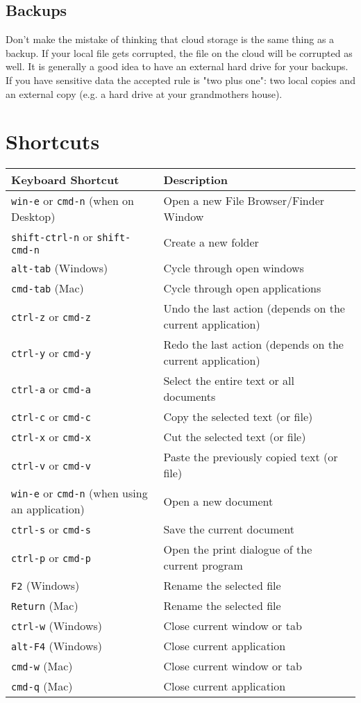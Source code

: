\documentclass[11pt,a4paper]{report}
\begin{document}
\subsection{Backups} 

Don't make the mistake of thinking that cloud storage is the same thing as a backup. If your local file gets corrupted, the file on the cloud will be corrupted as well. It is generally a good idea to have an external hard drive for your backups. If you have sensitive data the accepted rule is "two plus one": two local copies and an external copy (e.g. a hard drive at your grandmothers house).


\section{Shortcuts}
\begin{longtable}{|p{}|p{}|}
\hline
{\bf Keyboard Shortcut} & {\bf Description}  \\
\hline 
\endhead
\verb|win-e| or \verb|cmd-n| (when on Desktop) & Open a new File Browser/Finder Window \\
\hline
\verb|shift-ctrl-n| or \verb|shift-cmd-n| & Create a new folder\\
\hline
\verb|alt-tab| (Windows) & Cycle through open windows \\
\hline
\verb|cmd-tab| (Mac) & Cycle through open applications \\
\hline
\verb|ctrl-z| or \verb|cmd-z| & Undo the last action (depends on the current application)\\
\hline
\verb|ctrl-y| or \verb|cmd-y| & Redo the last action (depends on the current application)\\
\hline
\verb|ctrl-a| or \verb|cmd-a| & Select the entire text or all documents \\
\hline
\verb|ctrl-c| or \verb|cmd-c| & Copy the selected text (or file)\\
\hline
\verb|ctrl-x| or \verb|cmd-x| & Cut the selected text (or file)\\
\hline
\verb|ctrl-v| or \verb|cmd-v| & Paste the previously copied text (or file)\\
\hline
\verb|win-e| or \verb|cmd-n| (when using an application) & Open a new document \\
\verb|ctrl-s| or \verb|cmd-s| & Save the current document\\
\hline
\verb|ctrl-p| or \verb|cmd-p| & Open the print dialogue of the current program\\
\hline
\verb|F2| (Windows) & Rename the selected file\\
\hline
\verb|Return| (Mac) & Rename the selected file\\
\hline
\verb|ctrl-w| (Windows) & Close current window or tab\\
\hline
\verb|alt-F4| (Windows) & Close current application\\
\hline
\verb|cmd-w| (Mac) & Close current window or tab\\
\hline
\verb|cmd-q| (Mac) & Close current application\\
\hline



\end{longtable}
\end{document}

